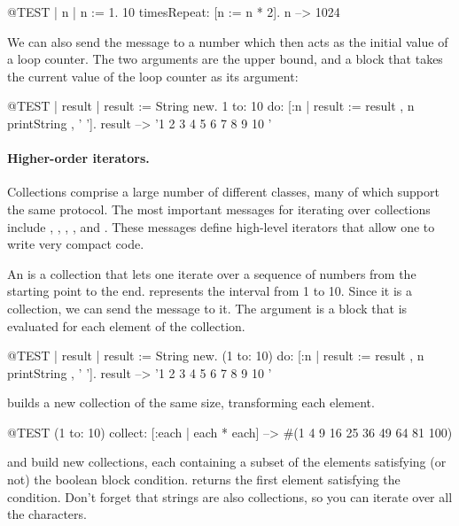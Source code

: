 \documentclass[a4paper,10pt,twoside]{book}
\begin{document}
\begin{code}{@TEST | n |}
n := 1.
10 timesRepeat: [n := n * 2].
n --> 1024
\end{code}

We can also send the message  to a number which then acts as the initial value of a loop counter.
The two arguments are the upper bound, and a block that takes the current value of the loop counter as its argument:

\begin{code}{@TEST | result |}
result := String new.
1 to: 10 do: [:n | result := result , n printString , ' '].
result --> '1 2 3 4 5 6 7 8 9 10 '
\end{code}

\paragraph{Higher-order iterators.}
Collections comprise a large number of different classes, many of which support the same protocol.
The most important messages for iterating over collections include
, , , ,  and .
These messages define high-level iterators that allow one to write very compact code.

An  is a collection that lets one iterate over a sequence of numbers from the starting point to the end.
 represents the interval from 1 to 10.
Since it is a collection, we can send the message  to it.
The argument is a block that is evaluated for each element of the collection.

\begin{code}{@TEST | result |}
result := String new.
(1 to: 10) do: [:n | result := result , n printString , ' '].
result --> '1 2 3 4 5 6 7 8 9 10 '
\end{code}

 builds a new collection of the same size, transforming each element.
\begin{code}{@TEST}
(1 to: 10) collect: [:each | each * each] --> #(1 4 9 16 25 36 49 64 81 100)
\end{code}

 and  build new collections, each containing a subset of the elements satisfying (or not) the boolean block condition.
 returns the first element satisfying the condition.
Don't forget that strings are also collections, so you can iterate over all the characters.
\end{document}
